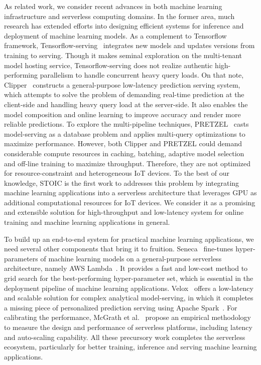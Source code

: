 As related work, we consider recent advances in both machine learning infrastructure and serverless computing domains. In the former area, much research has extended efforts into designing efficient systems for inference and deployment of machine learning models. As a complement to Tensorflow framework, Tensorflow-serving~\cite{ref:tensorflow-serving} integrates new models and updates versions from training to serving. Though it makes seminal exploration on the multi-tenant model hosting service, Tensorflow-serving does not realize authentic high-performing parallelism to handle concurrent heavy query loads. On that note, Clipper~\cite{ref:clipper} constructs a general-purpose low-latency prediction serving system, which attempts to solve the problem of demanding real-time prediction at the client-side and handling heavy query load at the server-side. It also enables the model composition and online learning to improve accuracy and render more reliable predictions. To explore the multi-pipeline techniques, PRETZEL~\cite{ref:pretzel} casts model-serving as a database problem and applies multi-query optimizations to maximize performance. However, both Clipper and PRETZEL could demand considerable compute resources in caching, batching, adaptive model selection and off-line training to maximize throughput. Therefore, they are not optimized for resource-constraint and heterogeneous IoT devices. To the best of our knowledge, STOIC is the first work to addresses this problem by integrating machine learning applications into a serverless architecture that leverages GPU as additional computational resources for IoT devices. We consider it as a promising and extensible solution for high-throughput and low-latency system for online training and machine learning applications in general. 

 To build up an end-to-end system for practical machine learning applications, we need several other components that bring it to fruition. Seneca~\cite{ref:seneca} fine-tunes hyper-parameters of machine learning models on a general-purpose serverless architecture, namely AWS Lambda~\cite{ref:lambda}. It provides a fast and low-cost method to grid search for the best-performing hyper-parameter set, which is essential in the deployment pipeline of machine learning applications. Velox~\cite{ref:velox} offers a low-latency and scalable solution for complex analytical model-serving, in which it completes a missing piece of personalized prediction serving using Apache Spark~\cite{ref:spark}. For calibrating the performance, McGrath et al.~\cite{ref:serverless} propose an empirical methodology to measure the design and performance of serverless platforms, including latency and auto-scaling capability. All these precursory work completes the serverless ecosystem, particularly for better training, inference and serving machine learning applications.